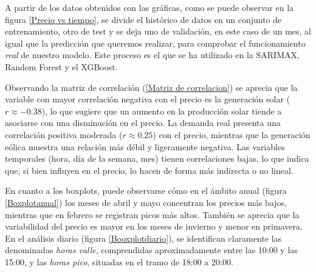 A partir de los datos obtenidos con las gráficas, como se puede observar en la figura \cref{Precio vs tiempo}, se divide el histórico de datos en un conjunto de entrenamiento, otro de test y se deja uno de validación, en este caso de un mes, al igual que la predicción que queremos realizar, para comprobar el funcionamiento \textit{real} de nuestro modelo. Este proceso es el que se ha utilizado en la SARIMAX, Random Forest y el XGBoost.

Observando la matriz de correlación (\cref{Matriz de correlacion}) se aprecia que la variable con mayor correlación negativa con el precio es la generación solar ($r \approx -0.38$), lo que sugiere que un aumento en la producción solar tiende a asociarse con una disminución en el precio. La demanda real presenta una correlación positiva moderada ($r \approx 0.25$) con el precio, mientras que la generación eólica muestra una relación más débil y ligeramente negativa. Las variables temporales (hora, día de la semana, mes) tienen correlaciones bajas, lo que indica que, si bien influyen en el precio, lo hacen de forma más indirecta o no lineal.

En cuanto a los boxplots, puede observarse cómo en el ámbito anual (figura \cref{Boxplotanual}) los meses de abril y mayo concentran los precios más bajos, mientras que en febrero se registran picos más altos. También se aprecia que la variabilidad del precio es mayor en los meses de invierno y menor en primavera. En el análisis diario (figura \cref{Booxplotdiario}), se identifican claramente las denominadas \textit{horas valle}, comprendidas aproximadamente entre las 10:00 y las 15:00, y las \textit{horas pico}, situadas en el tramo de 18:00 a 20:00. 

